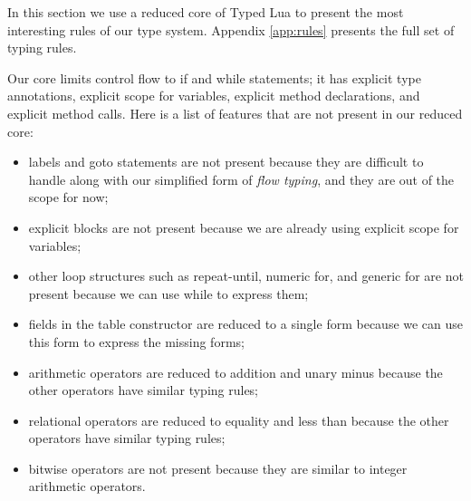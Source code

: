 In this section we use a reduced core of Typed Lua to present the
most interesting rules of our type system.
Appendix \ref{app:rules} presents the full set of typing rules.

Our core limits control flow to if and while statements;
it has explicit type annotations, explicit scope for variables,
explicit method declarations, and explicit method calls.
Here is a list of features that are not present in our reduced core:
\begin{itemize}
\item labels and goto statements are not present because they
are difficult to handle along with our simplified form of
\emph{flow typing}, and they are out of the scope for now;
\item explicit blocks are not present because we are already using
explicit scope for variables;
\item other loop structures such as repeat-until, numeric for,
and generic for are not present because we can use while to
express them;
\item fields in the table constructor are reduced to a single
form because we can use this form to express the missing forms; 
\item arithmetic operators are reduced to addition and unary minus
because the other operators have similar typing rules;
\item relational operators are reduced to equality and less than
because the other operators have similar typing rules;
\item bitwise operators are not present because they are similar
to integer arithmetic operators.
\end{itemize}

